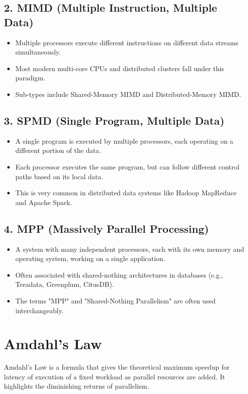 \documentclass{article}
\begin{document}
\subsection*{2. MIMD (Multiple Instruction, Multiple Data)}
\begin{itemize}
    \item Multiple processors execute different instructions on different data streams simultaneously.
    \item Most modern multi-core CPUs and distributed clusters fall under this paradigm.
    \item Sub-types include Shared-Memory MIMD and Distributed-Memory MIMD.
\end{itemize}

\subsection*{3. SPMD (Single Program, Multiple Data)}
\begin{itemize}
    \item A single program is executed by multiple processors, each operating on a different portion of the data.
    \item Each processor executes the same program, but can follow different control paths based on its local data.
    \item This is very common in distributed data systems like Hadoop MapReduce and Apache Spark.
\end{itemize}

\subsection*{4. MPP (Massively Parallel Processing)}
\begin{itemize}
    \item A system with many independent processors, each with its own memory and operating system, working on a single application.
    \item Often associated with shared-nothing architectures in databases (e.g., Teradata, Greenplum, CitusDB).
    \item The terms "MPP" and "Shared-Nothing Parallelism" are often used interchangeably.
\end{itemize}

\section*{Amdahl's Law}
Amdahl's Law is a formula that gives the theoretical maximum speedup for latency of execution of a fixed workload as parallel resources are added. It highlights the diminishing returns of parallelism.
\end{document}
